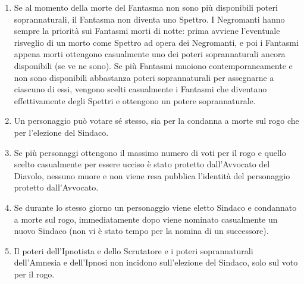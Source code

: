 \documentclass[a4paper,10pt]{article}
\begin{document}
\begin{enumerate}
 \item Se al momento della morte del Fantasma non sono più disponibili poteri soprannaturali, il Fantasma non diventa uno Spettro.
 I Negromanti hanno sempre la priorità sui Fantasmi morti di notte: prima avviene l'eventuale risveglio di un morto come Spettro ad opera dei Negromanti, e poi i Fantasmi appena morti ottengono casualmente uno dei poteri soprannaturali ancora disponibili (se ve ne sono).
 Se più Fantasmi muoiono contemporaneamente e non sono disponibili abbastanza poteri soprannaturali per assegnarne a ciascuno di essi, vengono scelti casualmente i Fantasmi che diventano effettivamente degli Spettri e ottengono un potere soprannaturale.
 
 \item Un personaggio può votare sé stesso, sia per la condanna a morte sul rogo che per l'elezione del Sindaco.
 
 \item Se più personaggi ottengono il massimo numero di voti per il rogo e quello scelto casualmente per essere ucciso è stato protetto dall'Avvocato del Diavolo, nessuno muore e non viene resa pubblica l'identità del personaggio protetto dall'Avvocato.
 
 \item Se durante lo stesso giorno un personaggio viene eletto Sindaco e condannato a morte sul rogo, immediatamente dopo viene nominato casualmente un nuovo Sindaco (non vi è stato tempo per la nomina di un successore).
 
 \item Il poteri dell'Ipnotista e dello Scrutatore e i poteri soprannaturali dell'Amnesia e dell'Ipnosi non incidono sull'elezione del Sindaco, solo sul voto per il rogo.
 
 

\end{enumerate}
\end{document}
